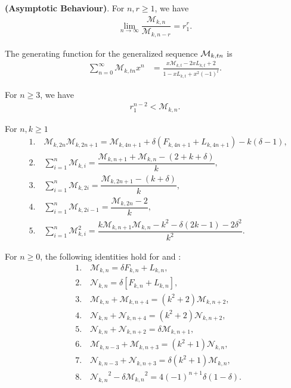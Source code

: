 \begin{theorem}\textbf{(Asymptotic Behaviour)}. For $n,r\geq{1}$, we have
\begin{align*}
\lim_{n \to \infty }\dfrac{\mathcal{M}_{k,n}}{\mathcal{M}_{k,n-r}}=r_{1}^r.
\end{align*}
\end{theorem}
\begin{theorem}
The generating function for the generalized \kF\vspace{.5mm} sequence $\mathcal{M}_{k,tn}$ is 
 \begin{align*}
\sum_{n=0}^{\infty}\mathcal{M}_{k,tn}x^n&=\frac{x\mathcal{M}_{k,t}-2xL_{k,t}+2}{1-xL_{k,t}+x^2(-1)^t}.
 \end{align*}
\end{theorem}
\begin{theorem} For $n\geq{3}$, we have
\begin{align*}
 r_{1}^{n-2}<\mathcal{M}_{k,n}.
  \end{align*}
\end{theorem}
\begin{theorem}For $n, k\geq 1$
\begin{align*}
&1. \quad \mathcal{M}_{k,2n}\mathcal{M}_{k,2n+1}=\mathcal{M}_{k,4n+1}+\delta(F_{k,4n+1}+L_{k,4n+1})-k(\delta-1),\\
&2. \quad\sum_{i=1}^{n}\mathcal{M}_{k,i}=\dfrac{\mathcal{M}_{k,n+1}+\mathcal{M}_{k,n}-(2+k+\delta)}{k},\\
&3. \quad\sum_{i=1}^{n}\mathcal{M}_{k,2i}=\dfrac{\mathcal{M}_{k,2n+1}-(k+\delta)}{k},\\
&4. \quad\sum_{i=1}^{n}\mathcal{M}_{k,2i-1}=\dfrac{\mathcal{M}_{k,2n}-2}{k},\\
&5. \quad\sum_{i=1}^{n}\mathcal{M}_{k,i}^2=\dfrac{k\mathcal{M}_{k,n+1}\mathcal{M}_{k,n}-k^2-\delta(2k-1)-2{\delta}^2}{k^2}.
\end{align*}
\end{theorem}
\begin{proposition}For $n\geq{0}$, the following identities hold for \M\vspace{.5mm} and \N\vspace{.5mm}:
\begin{align*}
&1. \quad\mathcal{M}_{k,n}=\delta F_{k,n}+L_{k,n},\\
&2. \quad\mathcal{N}_{k,n}=\delta\left[ F_{k,n}+L_{k,n}\right],\\
&3. \quad\mathcal{M}_{k,n}+\mathcal{M}_{k,n+4}=(k^2+2)\mathcal{M}_{k,n+2},\\
&4. \quad\mathcal{N}_{k,n}+\mathcal{N}_{k,n+4}=(k^2+2)\mathcal{N}_{k,n+2},\\
&5. \quad\mathcal{N}_{k,n}+\mathcal{N}_{k,n+2}=\delta\mathcal{M}_{k,n+1},\\
&6. \quad\mathcal{M}_{k,n-3}+\mathcal{M}_{k,n+3}=(k^2+1)\mathcal{N}_{k,n},\\
&7. \quad\mathcal{N}_{k,n-3}+\mathcal{N}_{k,n+3}=\delta(k^2+1)\mathcal{M}_{k,n},\\
&8. \quad{\mathcal{N}_{k,n}}^2-\delta{\mathcal{M}_{k,n}}^2=4(-1)^{n+1}\delta(1-\delta).
\end{align*}
\end{proposition}
